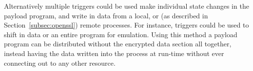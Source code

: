 \smallskip

Alternatively multiple triggers could be used make individual state changes in
the payload program, and write in data from a local, or (as described in
Section~\ref{subsec:openssl}) remote processes. For instance, triggers could be
used to shift in data or an entire program for emulation.
Using this method a payload
program can be distributed without the encrypted data section all together,
instead having the data written into the process at run-time without ever
connecting out to any other resource.



